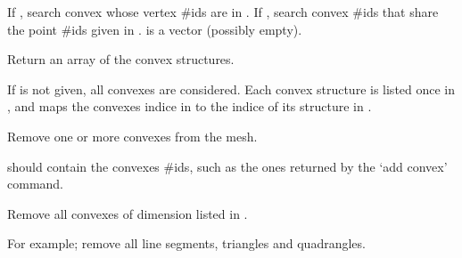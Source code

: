 \documentclass[a4paper,11pt,english]{sphinxmanual}
\begin{document}
\begin{fulllineitems}
\begin{fulllineitems}
If , search convex whose vertex \#ids are in .
If , search convex \#ids that share the point \#ids
given in .  is a  vector (possibly
empty).

\end{fulllineitems}


\begin{fulllineitems}
\label{\detokenize{python/cmdref_Mesh:getfem.Mesh.cvstruct}}
Return an array of the convex structures.

If  is not given, all convexes are considered. Each convex
structure is listed once in , and  maps the convexes
indice in  to the indice of its structure in .

\end{fulllineitems}


\begin{fulllineitems}
\label{\detokenize{python/cmdref_Mesh:getfem.Mesh.del_convex}}
Remove one or more convexes from the mesh.

 should contain the convexes \#ids, such as the ones
returned by the ‘add convex’ command.

\end{fulllineitems}


\begin{fulllineitems}
\label{\detokenize{python/cmdref_Mesh:getfem.Mesh.del_convex_of_dim}}
Remove all convexes of dimension listed in .

For example;  remove
all line segments, triangles and quadrangles.


\end{fulllineitems}
\end{fulllineitems}
\end{document}
